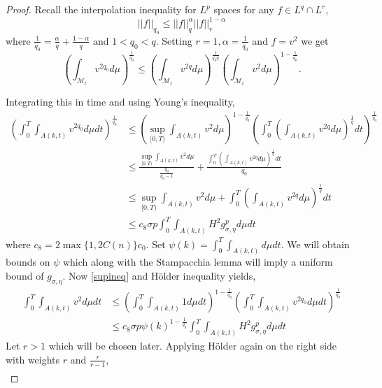 \begin{proof}
        Recall the interpolation inequality for $ L^{p} $ spaces for any $ f \in L^{q} \cap L^{r} $,
        \[ ||f||_{q_{0}} \le ||f||_{q}^{\alpha}||f||_{r}^{1-\alpha} \]
        where $ \frac{1}{q_{0}} = \frac{\alpha}{q}+ \frac{1-\alpha}{q} $ and $ 1<q_{0}<q $. Setting $ r=1, \alpha = \frac{1}{q_{0}}$ and $ f=v^{2} $ we get \begin{equation}
            \left( \int_{\mathcal{M}_{t}}v^{2q_{0}} d \mu \right)^{\frac{1}{q_{0}}} \le \left( \int_{\mathcal{M}_{t}}v^{2q}d \mu \right)^{\frac{1}{q_{0}q}} \left( \int_{\mathcal{M}_{t}}v^{2}d \mu \right)^{1-\frac{1}{q_{0}}}.
        \end{equation}

        Integrating this in time and using Young's inequality, \begin{align*}
            \left( \int_{0}^{T}\int_{A(k,t)}v^{2q_{0}}d \mu dt \right)^{\frac{1}{q_{0}}} &\le \left( \sup_{[0,T)}\int_{A(k,t)}v^{2}d \mu  \right)^{1-\frac{1}{q_{0}}}\left( \int_{0}^{T}\left( \int_{A(k,t)}v^{2q}d \mu \right)^{\frac{1}{q}} dt\right)^{\frac{1}{q_{0}}} \\
            & \le \frac{ \sup_{[0,T)}\int_{A(k,t)}v^{2}d \mu}{\frac{q_{0}}{q_{0}-1}}+ \frac{\int_{0}^{T}\left( \int_{A(k,t)}v^{2q}d \mu \right)^{\frac{1}{q}} dt}{q_{0}} \\
            & \le  \sup_{[0,T)}\int_{A(k,t)}v^{2}d \mu+ \int_{0}^{T}\left( \int_{A(k,t)}v^{2q}d \mu \right)^{\frac{1}{q}} dt \\
            & \le c_{8} \sigma p \int_{0}^{T}\int_{A(k,t)}H^{2}g_{\sigma,\eta}^{p}d \mu dt
        \end{align*}
        where $ c_{8} =  2\max\{1,2C(n)\}c_{0}$. Set $ \psi(k) = \int_{0}^{T} \int_{A(k,t)}d \mu dt $. We will obtain bounds on $ \psi $ which along with the Stampacchia lemma will imply a uniform bound of $ g_{\sigma,\eta} $.  Now \cref{supineq} and H\"{o}lder inequality yields, \begin{align}
            \int_{0}^{T}\int_{A(k,t)}v^{2}d \mu dt & \le \left( \int_{0}^{T}\int_{A(k,t)}1 d \mu dt\right)^{1-\frac{1}{q_{0}}} \left( \int_{0}^{T}\int_{A(k,t)}v^{2q_{0}}d \mu dt \right)^{\frac{1}{q_{0}}} \\
            & \le c_{8} \sigma p\psi(k)^{1-\frac{1}{q_{0}}} \int_{0}^{T}\int_{A(k,t)}H^{2}g_{\sigma,\eta}^{p}d \mu dt \label{v2bound}
        \end{align}
        Let $ r>1 $ which will be chosen later. Applying H\"{o}lder again on the right side with weights $ r $ and $ \frac{r}{r-1} $, \begin{align*}

\end{align*}
\end{proof}
